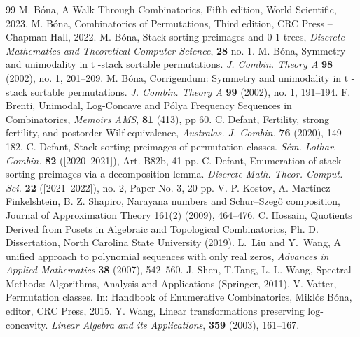 \documentclass[11pt]{article}
\begin{document}
\begin{thebibliography}{99}
 M. B\'ona, A Walk Through Combinatorics, Fifth edition, World Scientific, 2023. 
 M. B\'ona, Combinatorics of Permutations, Third edition, CRC Press -- Chapman Hall, 2022. 
 M. B\'ona, Stack-sorting preimages and 0-1-trees, {\em Discrete Mathematics and Theoretical Computer Science}, {\bf 28} no. 1. 
 M. B\'ona, Symmetry and unimodality in  t -stack sortable permutations. {\em J. Combin. Theory A} {\bf 98} (2002), no. 1, 201--209.
 M. B\'ona, Corrigendum: Symmetry and unimodality in  t -stack sortable permutations. {\em J. Combin. Theory A} {\bf 99} (2002), no. 1, 191--194.
 F. Brenti, Unimodal, Log-Concave and P\'olya Frequency Sequences in Combinatorics, {\em Memoirs AMS}, {\bf 81} (413), pp 60. 
 C. Defant, Fertility, strong fertility, and postorder Wilf equivalence, {\em Australas. J. Combin.} {\bf 76} (2020), 149--182.
 C. Defant, Stack-sorting preimages of permutation classes. {\em S\'em. Lothar. Combin.} {\bf 82} ([2020--2021]), Art. B82b, 41 pp.
 C. Defant,  Enumeration of stack-sorting preimages via a decomposition lemma. {\em Discrete Math. Theor. Comput. Sci.} {\bf 22} ([2021--2022]), no. 2, Paper No. 3, 20 pp.
 V. P. Kostov, A. Martínez-Finkelshtein, B. Z. Shapiro, Narayana numbers and Schur–Szegő composition, Journal of Approximation Theory 161(2) (2009), 464–476.
 C. Hossain, Quotients Derived from Posets in Algebraic and Topological Combinatorics, Ph. D. Dissertation, North Carolina State University (2019).
 L.~Liu and Y.~Wang, A unified approach to polynomial sequences with only real zeros,
 \emph{Advances in Applied Mathematics} \textbf{38} (2007), 542--560.
 J. Shen, T.Tang, L.-L. Wang, Spectral Methods: Algorithms, Analysis and Applications (Springer, 2011).
 V. Vatter, Permutation classes. In: Handbook of Enumerative Combinatorics, Mikl\'os B\'ona, editor,
CRC Press, 2015.
 Y. Wang, Linear transformations preserving log-concavity. {\em Linear Algebra and its Applications}, {\bf 359} (2003), 161--167.
\end{thebibliography}
\end{document}
